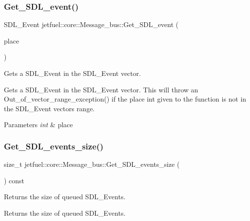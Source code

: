 \subsubsection{\texorpdfstring{Get\+\_\+\+S\+D\+L\+\_\+event()}{Get\_SDL\_event()}}
{\footnotesize\ttfamily S\+D\+L\+\_\+\+Event jetfuel\+::core\+::\+Message\+\_\+bus\+::\+Get\+\_\+\+S\+D\+L\+\_\+event (\begin{DoxyParamCaption}\item[{const int}]{place }\end{DoxyParamCaption})\hspace{0.3cm}{\ttfamily [inline]}}



Gets a S\+D\+L\+\_\+\+Event in the S\+D\+L\+\_\+\+Event vector. 

Gets a S\+D\+L\+\_\+\+Event in the S\+D\+L\+\_\+\+Event vector. This will throw an Out\+\_\+of\+\_\+vector\+\_\+range\+\_\+exception() if the place int given to the function is not in the S\+D\+L\+\_\+\+Event vector\textquotesingle{}s range.


\begin{DoxyParams}{Parameters}
{\em int} & place \\
\hline
\end{DoxyParams}
\mbox{\label{classjetfuel_1_1core_1_1Message__bus_aa363b50d4ba99ae86430b5f12610fd39}} 
\subsubsection{\texorpdfstring{Get\+\_\+\+S\+D\+L\+\_\+events\+\_\+size()}{Get\_SDL\_events\_size()}}
{\footnotesize\ttfamily size\+\_\+t jetfuel\+::core\+::\+Message\+\_\+bus\+::\+Get\+\_\+\+S\+D\+L\+\_\+events\+\_\+size (\begin{DoxyParamCaption}{ }\end{DoxyParamCaption}) const\hspace{0.3cm}{\ttfamily [inline]}}



Returns the size of queued S\+D\+L\+\_\+\+Events. 

Returns the size of queued S\+D\+L\+\_\+\+Events. \mbox{\label{classjetfuel_1_1core_1_1Message__bus_ad659ed1f593c8e57ec0308e8bb1f20cb}} 
